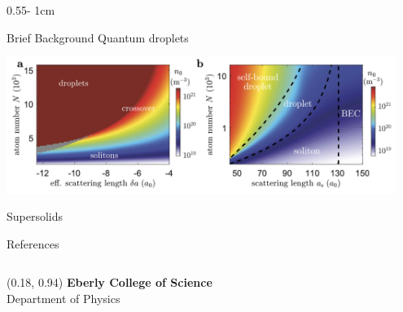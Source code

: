 \documentclass{../psuposter}
\begin{document}
\begin{frame}
\begin{columns}[t, totalwidth=\textwidth]
\begin{column}{0.55\textwidth - 1cm}
    \begin{block}{Brief Background}
        Quantum droplets \cite{lahayePhysicsDipolarBosonic2009} 

        \begin{center}
		   	\includegraphics[width=0.95\textwidth]{images/droplet}    		
    	\end{center}
		 Supersolids \cite{bottcherNewStatesMatter2020} 

    \end{block}


    \begin{block}{References}
        
%        
		
    \end{block}

\end{column}
\end{columns}


\begin{textblock}{0.5}(0.18, 0.94)
    \color{white}
    \sffamily
    \textbf{Eberly College of Science}
    \\
    Department of Physics
\end{textblock}


\end{frame}
\end{document}
